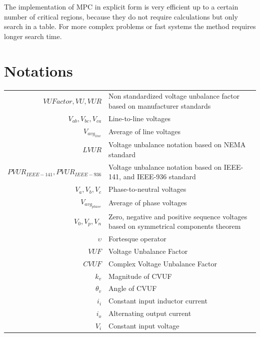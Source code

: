 The implementation of MPC in explicit form is very efficient up to a certain number of critical regions, because they do not require calculations but only search in a table. For more complex problems or fast systems the method requires longer search time.

\section{Notations}

\begin{tabularx}{\textwidth}{r|l}
  $VUFactor,VU,VUR$                	& Non standardized voltage unbalance factor based on manufacturer standards\\
	$V_{ab},V_{bc},V_{ca}$  					& Line-to-line voltages\\
	$V_{avg_{line}}$  								& Average of line voltages\\
	$LVUR$														& Voltage unbalance notation based on NEMA standard\\
	$PVUR_{IEEE-141},PVUR_{IEEE-936}$	& Voltage unbalance notation based on IEEE-141, and IEEE-936 standard\\
	$V_{a},V_{b},V_{c}$  							& Phase-to-neutral voltages\\
	$V_{avg_{phase}}$  								& Average of phase voltages\\
	$V_{0},V_{p},V_{n}$  							& Zero, negative and positive sequence voltages based on symmetrical components theorem\\
  $\upsilon$  											& Fortesque operator\\
	$VUF$  														& Voltage Unbalance Factor\\
	$CVUF$  													& Complex Voltage Unbalance Factor\\
	$k_v$  														& Magnitude of CVUF\\
	$\theta_v$  											& Angle of CVUF\\
	$i_i$															& Constant input inductor current\\
	$i_o$															& Alternating output current\\
	$V_i$															& Constant input voltage\\

\end{tabularx}
